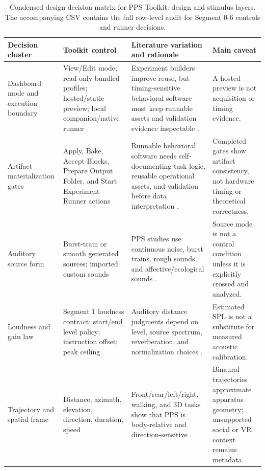 \documentclass[pdflatex,sn-apa]{sn-jnl}
\begin{document}
\begin{table}[t]
\caption{Condensed design-decision matrix for PPS Toolkit: design and stimulus layers. The accompanying CSV contains the full row-level audit for Segment 0-6 controls and runner decisions.}
\label{tab:matrix-core}
\footnotesize
\setlength{\tabcolsep}{3pt}
\begin{tabularx}{\textwidth}{>{\raggedright\arraybackslash}p{} >{\raggedright\arraybackslash}p{} >{\raggedright\arraybackslash}X >{\raggedright\arraybackslash}p{}}
\toprule
Decision cluster & Toolkit control & Literature variation and rationale & Main caveat \\
\midrule
Dashboard mode and execution boundary & View/Edit mode; read-only bundled profiles; hosted/static preview; local companion/native runner & Experiment builders improve reuse, but timing-sensitive behavioral software must keep runnable assets and validation evidence inspectable \citep{AnwylIrvine2018,Peirce2019,Bridges2020,Ellis2024}. & A hosted preview is not acquisition or timing evidence. \\
Artifact materialization gates & Apply, Bake, Accept Blocks, Prepare Output Folder, and Start Experiment Runner actions & Runnable behavioral software needs self-documenting task logic, reusable operational assets, and validation before data interpretation \citep{AnwylIrvine2018,Akam2022,DeLeeuw2022,Ellis2024}. & Completed gates show artifact consistency, not hardware timing or theoretical correctness. \\
Auditory source form & Burst-train or smooth generated sources; imported custom sounds & PPS studies use continuous noise, burst trains, rough sounds, and affective/ecological sounds \citep{Canzoneri2012,Farne2002,Hug2019,Taffou2021,Roussel2025}. & Source mode is not a control condition unless it is explicitly crossed and analyzed. \\
Loudness and gain law & Segment 1 loudness contract; start/end level policy; instruction offset; peak ceiling & Auditory distance judgments depend on level, source spectrum, reverberation, and normalization choices \citep{Zahorik2002,Kolarik2015,Spagnol2017,Arend2021Level}. & Estimated SPL is not a substitute for measured acoustic calibration. \\
Trajectory and spatial frame & Distance, azimuth, elevation, direction, duration, speed & Front/rear/left/right, walking, and 3D tasks show that PPS is body-relative and direction-sensitive \citep{Matsuda2021,Noel2015,Teraoka2024,Amiel2025}. & Binaural trajectories approximate apparatus geometry; unsupported social or VR context remains metadata. \\

\end{tabularx}
\end{table}
\end{document}
